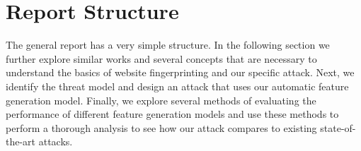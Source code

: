 \section{Report Structure}
The general report has a very simple structure.
In the following section we further explore similar works and several concepts that are necessary to understand the basics of website fingerprinting and our specific attack.
Next, we identify the threat model and design an attack that uses our automatic feature generation model.
Finally, we explore several methods of evaluating the performance of different feature generation models and use these methods to perform a thorough analysis to see how our attack compares to existing state-of-the-art attacks.
